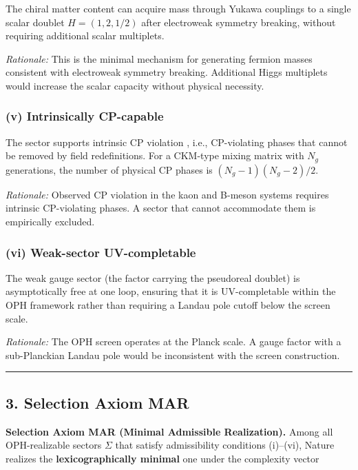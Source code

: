 The chiral matter content can acquire mass through Yukawa couplings to a single scalar doublet \(H = (1, 2, 1/2)\) after electroweak symmetry breaking, without requiring additional scalar multiplets.

\emph{Rationale:} This is the minimal mechanism for generating fermion masses consistent with electroweak symmetry breaking. Additional Higgs multiplets would increase the scalar capacity without physical necessity.

\subsubsection{(v) Intrinsically CP-capable}\label{v-intrinsically-cp-capable}

The sector supports intrinsic CP violation , i.e., CP-violating phases that cannot be removed by field redefinitions. For a CKM-type mixing matrix with \(N_g\) generations, the number of physical CP phases is \((N_g - 1)(N_g - 2)/2\).

\emph{Rationale:} Observed CP violation in the kaon and B-meson systems requires intrinsic CP-violating phases. A sector that cannot accommodate them is empirically excluded.

\subsubsection{(vi) Weak-sector UV-completable}\label{vi-weak-sector-uv-completable}

The weak gauge sector (the factor carrying the pseudoreal doublet) is asymptotically free at one loop, ensuring that it is UV-completable within the OPH framework rather than requiring a Landau pole cutoff below the screen scale.

\emph{Rationale:} The OPH screen operates at the Planck scale. A gauge factor with a sub-Planckian Landau pole would be inconsistent with the screen construction.

\begin{center}\rule{0.5\linewidth}{0.5pt}\end{center}

\subsection{3. Selection Axiom MAR}\label{3-selection-axiom-mar}

\textbf{Selection Axiom MAR (Minimal Admissible Realization).} Among all OPH-realizable sectors \(\Sigma\) that satisfy admissibility conditions (i)--(vi), Nature realizes the \textbf{lexicographically minimal} one under the complexity vector

